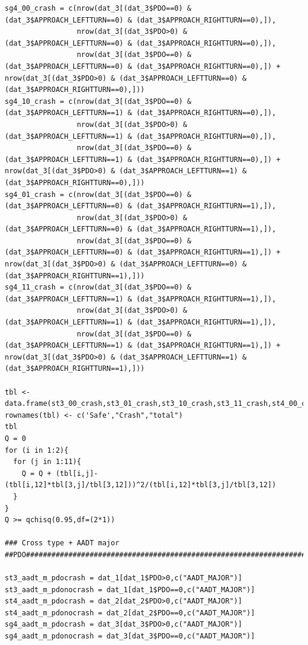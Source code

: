 \documentclass[11pt]{scrartcl} %
\begin{document}
\begin{lstlisting}
sg4_00_crash = c(nrow(dat_3[(dat_3$PDO==0) & (dat_3$APPROACH_LEFTTURN==0) & (dat_3$APPROACH_RIGHTTURN==0),]),
                 nrow(dat_3[(dat_3$PDO>0) & (dat_3$APPROACH_LEFTTURN==0) & (dat_3$APPROACH_RIGHTTURN==0),]),
                 nrow(dat_3[(dat_3$PDO==0) & (dat_3$APPROACH_LEFTTURN==0) & (dat_3$APPROACH_RIGHTTURN==0),]) + nrow(dat_3[(dat_3$PDO>0) & (dat_3$APPROACH_LEFTTURN==0) & (dat_3$APPROACH_RIGHTTURN==0),]))
sg4_10_crash = c(nrow(dat_3[(dat_3$PDO==0) & (dat_3$APPROACH_LEFTTURN==1) & (dat_3$APPROACH_RIGHTTURN==0),]),
                 nrow(dat_3[(dat_3$PDO>0) & (dat_3$APPROACH_LEFTTURN==1) & (dat_3$APPROACH_RIGHTTURN==0),]),
                 nrow(dat_3[(dat_3$PDO==0) & (dat_3$APPROACH_LEFTTURN==1) & (dat_3$APPROACH_RIGHTTURN==0),]) + nrow(dat_3[(dat_3$PDO>0) & (dat_3$APPROACH_LEFTTURN==1) & (dat_3$APPROACH_RIGHTTURN==0),]))
sg4_01_crash = c(nrow(dat_3[(dat_3$PDO==0) & (dat_3$APPROACH_LEFTTURN==0) & (dat_3$APPROACH_RIGHTTURN==1),]),
                 nrow(dat_3[(dat_3$PDO>0) & (dat_3$APPROACH_LEFTTURN==0) & (dat_3$APPROACH_RIGHTTURN==1),]),
                 nrow(dat_3[(dat_3$PDO==0) & (dat_3$APPROACH_LEFTTURN==0) & (dat_3$APPROACH_RIGHTTURN==1),]) + nrow(dat_3[(dat_3$PDO>0) & (dat_3$APPROACH_LEFTTURN==0) & (dat_3$APPROACH_RIGHTTURN==1),]))
sg4_11_crash = c(nrow(dat_3[(dat_3$PDO==0) & (dat_3$APPROACH_LEFTTURN==1) & (dat_3$APPROACH_RIGHTTURN==1),]),
                 nrow(dat_3[(dat_3$PDO>0) & (dat_3$APPROACH_LEFTTURN==1) & (dat_3$APPROACH_RIGHTTURN==1),]),
                 nrow(dat_3[(dat_3$PDO==0) & (dat_3$APPROACH_LEFTTURN==1) & (dat_3$APPROACH_RIGHTTURN==1),]) + nrow(dat_3[(dat_3$PDO>0) & (dat_3$APPROACH_LEFTTURN==1) & (dat_3$APPROACH_RIGHTTURN==1),]))

tbl <- data.frame(st3_00_crash,st3_01_crash,st3_10_crash,st3_11_crash,st4_00_crash,st4_10_crash,st4_11_crash,sg4_00_crash,sg4_01_crash,sg4_10_crash,sg4_11_crash,total)
rownames(tbl) <- c('Safe',"Crash","total")
tbl
Q = 0
for (i in 1:2){
  for (j in 1:11){
    Q = Q + (tbl[i,j]-(tbl[i,12]*tbl[3,j]/tbl[3,12]))^2/(tbl[i,12]*tbl[3,j]/tbl[3,12])
  }
}
Q >= qchisq(0.95,df=(2*1))

### Cross type + AADT major
##PDO########################################################################################################################################

st3_aadt_m_pdocrash = dat_1[dat_1$PDO>0,c("AADT_MAJOR")]
st3_aadt_m_pdonocrash = dat_1[dat_1$PDO==0,c("AADT_MAJOR")]
st4_aadt_m_pdocrash = dat_2[dat_2$PDO>0,c("AADT_MAJOR")]
st4_aadt_m_pdonocrash = dat_2[dat_2$PDO==0,c("AADT_MAJOR")]
sg4_aadt_m_pdocrash = dat_3[dat_3$PDO>0,c("AADT_MAJOR")]
sg4_aadt_m_pdonocrash = dat_3[dat_3$PDO==0,c("AADT_MAJOR")]


\end{lstlisting}
\end{document}
